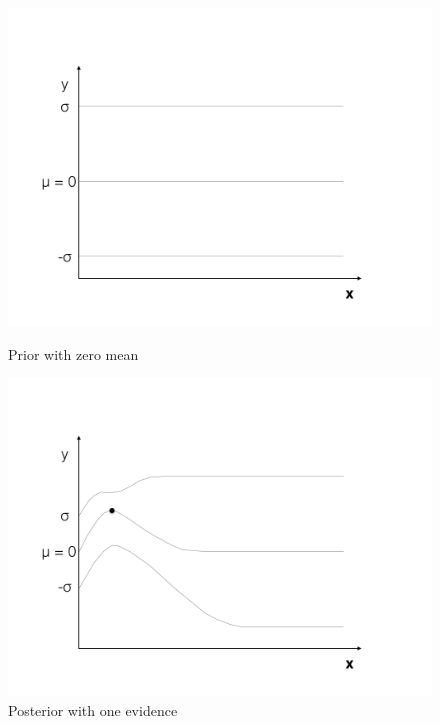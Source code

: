 \documentclass[english]{tktltiki}
\begin{document}
\iffalse

\begin{figure}[h!]
\centering
\begin{minipage}{.5\linewidth}
  \centering
  \includegraphics[width=\linewidth]{figures/GP_1.png}
  \caption{Prior with zero mean}
  \label{fig:sub1}
\end{minipage}%
\begin{minipage}{.5\linewidth}
  \centering
  \includegraphics[width=\linewidth]{figures/GP_2.png}
  \caption{Posterior with one evidence}
  \label{fig:sub2}
\end{minipage}


\end{figure}
\end{document}
